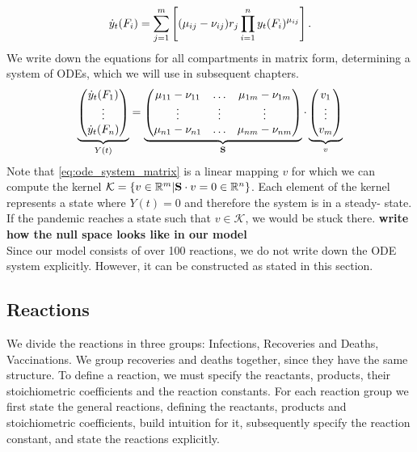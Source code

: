 \begin{align}
\dot{y}_t(F_i) = \sum_{j=1}^m \left[(\mu_{ij} - \nu_{ij}) r_j  \prod_{i=1}^n y_t(F_i)^{\mu_{ij}} \right].
\end{align}
We write down the equations for all compartments in matrix form, determining a system of ODEs, which we will use in subsequent chapters.
\begin{align}
\label{eq:ode_system_matrix}
\underbrace{\begin{pmatrix}
\dot{y}_t(F_1) \\ \vdots \\ \dot{y}_t(F_n) \end{pmatrix}}_{Y(t)} =
\underbrace{\begin{pmatrix}
\mu_{11} - \nu_{11} & \hdots & \mu_{1m} - \nu_{1m} \\
\vdots & \vdots & \vdots \\
\mu_{n1} - \nu_{n1} & \hdots & \mu_{nm} - \nu_{nm} \\
\end{pmatrix}}_{\mathbf{S}} \cdot
\underbrace{\begin{pmatrix}
v_1 \\ \vdots \\ v_m
\end{pmatrix}}_{v}
\end{align}
Note that \eqref{eq:ode_system_matrix} is a linear mapping $v$ for which we can compute the kernel $\mathcal{K}=\left\{v \in \mathbb{R}^m | \mathbf{S} \cdot v = 0 \in \mathbb{R}^n  \right\}$. Each element of the kernel represents a state where $Y(t)=0$ and therefore the system is in a steady- state. If the pandemic reaches a state such that $v \in \mathcal{K}$, we would be stuck there. \textbf{write how the null space looks like in our model} \\

Since our model consists of over 100 reactions, we do not write down the ODE system explicitly. However, it can be constructed as stated in this section.  
\subsection{Reactions}
We divide the reactions in three groups: Infections, Recoveries and Deaths, Vaccinations. We group recoveries and deaths together, since they have the same structure. To define a reaction, we must specify the reactants, products, their stoichiometric coefficients and the reaction constants. For each reaction group we first state the general reactions, defining the reactants, products and stoichiometric coefficients, build intuition for it, subsequently specify the reaction constant, and state the reactions explicitly.


